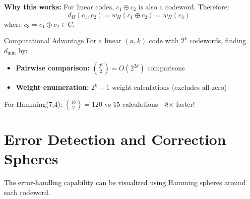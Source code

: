 \textbf{Why this works:} For linear codes, $c_1 \oplus c_2$ is also a codeword. Therefore:
\[
d_H(c_1, c_2) = w_H(c_1 \oplus c_2) = w_H(c_3)
\]
where $c_3 = c_1 \oplus c_2 \in C$.

\begin{calloutbox}{Computational Advantage}
For a linear $(n,k)$ code with $2^k$ codewords, finding $d_{\min}$ by:
\begin{itemize}
\item \textbf{Pairwise comparison:} $\binom{2^k}{2} = O(2^{2k})$ comparisons
\item \textbf{Weight enumeration:} $2^k - 1$ weight calculations (excludes all-zero)
\end{itemize}

For Hamming(7,4): $\binom{16}{2} = 120$ vs $15$ calculations---8$\times$ faster!
\end{calloutbox}

\section{Error Detection and Correction Spheres}

The error-handling capability can be visualized using Hamming spheres around each codeword.

